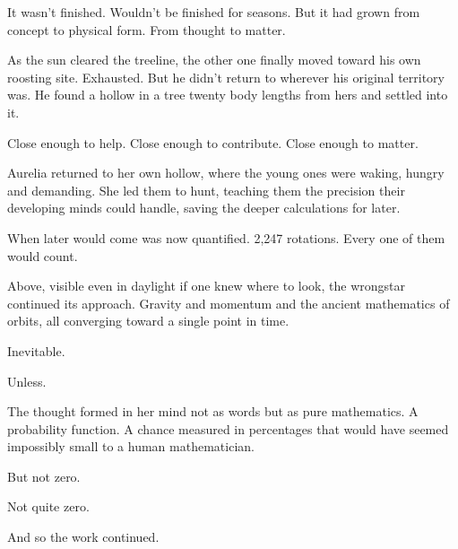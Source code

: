 It wasn't finished. Wouldn't be finished for seasons. But it had grown from concept to physical form. From thought to matter.

As the sun cleared the treeline, the other one finally moved toward his own roosting site. Exhausted. But he didn't return to wherever his original territory was. He found a hollow in a tree twenty body lengths from hers and settled into it.

Close enough to help. Close enough to contribute. Close enough to matter.

Aurelia returned to her own hollow, where the young ones were waking, hungry and demanding. She led them to hunt, teaching them the precision their developing minds could handle, saving the deeper calculations for later.

When later would come was now quantified. 2,247 rotations. Every one of them would count.

Above, visible even in daylight if one knew where to look, the wrongstar continued its approach. Gravity and momentum and the ancient mathematics of orbits, all converging toward a single point in time.

Inevitable.

Unless.

The thought formed in her mind not as words but as pure mathematics. A probability function. A chance measured in percentages that would have seemed impossibly small to a human mathematician.

But not zero.

Not quite zero.

And so the work continued.

